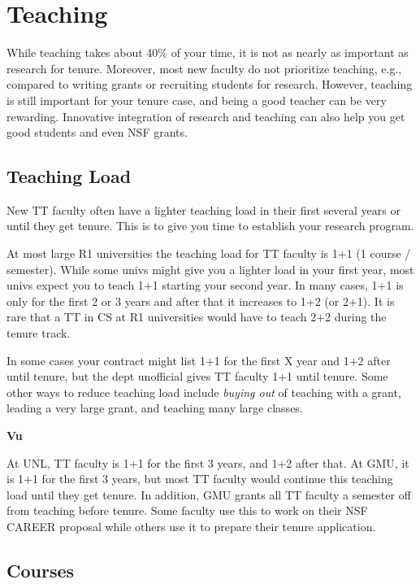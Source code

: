 \documentclass[oneside,11pt,dvipsnames]{book}
\newenvironment{commentbox}[1][]{
  \small
  \begin{mybox}
    {\small \textbf{#1}}
  }{
  \end{mybox}
}
\begin{document}
\chapter{Teaching}\label{chapter:teaching}

While teaching takes about 40\% of your time, it is not as nearly as important as research for tenure.  Moreover, most new faculty do not prioritize teaching, e.g., compared to writing grants or recruiting students for research.  However, teaching is still important for your tenure case, and being a good teacher can be very rewarding. Innovative integration of research and teaching can also help you get good students and even NSF grants.

\section{Teaching Load}
New TT faculty often have a lighter teaching load in their first several years or until they get tenure.  This is to give you time to establish your research program.

At most large R1 universities the teaching load for TT faculty is 1+1 (1 course / semester). While some univs might give you a lighter load in your first year, most univs expect you to teach 1+1 starting your second year. In many cases, 1+1 is only for the first 2 or 3 years and after that it increases to 1+2 (or 2+1). It is rare that a TT in CS at R1 universities would have to teach 2+2 during the tenure track.

In some cases your contract might list 1+1 for the first X year and 1+2 after until tenure, but the dept unofficial gives TT faculty 1+1 until tenure. Some other ways to reduce teaching load include \emph{buying out} of teaching with a grant, leading a very large grant, and teaching many large classes.

\begin{commentbox}[Vu]
    At UNL, TT faculty is 1+1 for the first 3 years, and 1+2 after that.  At GMU, it is 1+1 for the first 3 years, but most TT faculty would continue this teaching load until they get tenure. In addition, GMU grants all TT faculty a semester off from teaching before tenure. Some faculty use this to work on their NSF CAREER proposal while others use it to prepare their tenure application. 
\end{commentbox}
  

\section{Courses}
\end{document}
